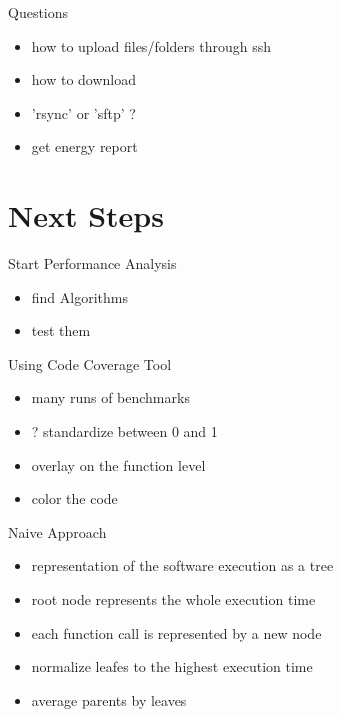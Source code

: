 \documentclass[11pt,aspectratio=169]{beamer}
\begin{document}
\begin{frame}{Questions}
  \begin{itemize}
    \item how to upload files/folders through ssh
    \item how to download
    \item 'rsync' or 'sftp' ?
    \item get energy report
  \end{itemize}
\end{frame}

\section{Next Steps}

\begin{frame}{Start Performance Analysis}
  \begin{itemize}
    \item find Algorithms
    \item test them
  \end{itemize}
\end{frame}

\begin{frame}{Using Code Coverage Tool}
  \begin{itemize}
    \item many runs of benchmarks 
    \item ? standardize between 0 and 1
    \item overlay on the function level
    \item color the code
  \end{itemize}
\end{frame}

\begin{frame}{Naive Approach}
  \begin{itemize}
    \item representation of the software execution as a tree 
    \item root node represents the whole execution time
    \item each function call is represented by a new node
    \item normalize leafes to the highest execution time
    \item average parents by leaves
  \end{itemize}
\end{frame}


\appendix
\end{document}
